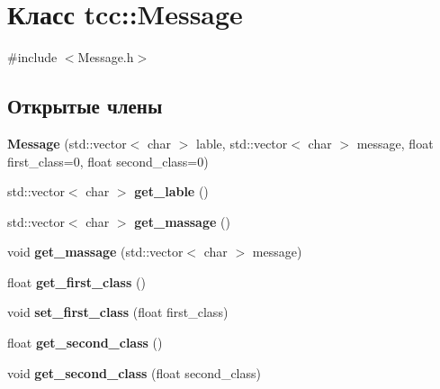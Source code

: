 \hypertarget{classtcc_1_1_message}{}\section{Класс tcc\+:\+:Message}
\label{classtcc_1_1_message}


{\ttfamily \#include $<$Message.\+h$>$}

\subsection*{Открытые члены}
\begin{DoxyCompactItemize}
\item 
\mbox{\label{classtcc_1_1_message_a879800057e2962e411c8dcbfbe1dcdcb}} 
{\bfseries Message} (std\+::vector$<$ char $>$ lable, std\+::vector$<$ char $>$ message, float first\+\_\+class=0, float second\+\_\+class=0)
\item 
\mbox{\label{classtcc_1_1_message_a8894895521fcd5610789026f8bbe0e2b}} 
std\+::vector$<$ char $>$ {\bfseries get\+\_\+lable} ()
\item 
\mbox{\label{classtcc_1_1_message_a2feb8596edefb09598873dcbf8b638a3}} 
std\+::vector$<$ char $>$ {\bfseries get\+\_\+massage} ()
\item 
\mbox{\label{classtcc_1_1_message_a61ab8c24bbea0979e101971ec0642b72}} 
void {\bfseries get\+\_\+massage} (std\+::vector$<$ char $>$ message)
\item 
\mbox{\label{classtcc_1_1_message_adebec11db031589766b15485d2b8d625}} 
float {\bfseries get\+\_\+first\+\_\+class} ()
\item 
\mbox{\label{classtcc_1_1_message_abb4d7fbab4cd095398855bc7edcb0c3b}} 
void {\bfseries set\+\_\+first\+\_\+class} (float first\+\_\+class)
\item 
\mbox{\label{classtcc_1_1_message_a73e9a04d44b6fe3314000802465058d2}} 
float {\bfseries get\+\_\+second\+\_\+class} ()
\item 
\mbox{\label{classtcc_1_1_message_a4f1d02f7894914fb074b45de1d81cdfc}} 
void {\bfseries get\+\_\+second\+\_\+class} (float second\+\_\+class)
\end{DoxyCompactItemize}


